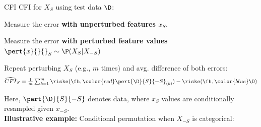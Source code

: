 \documentclass[10pt,compress,t,notes=noshow, xcolor=table]{beamer}
\begin{document}



\begin{framev}[align=top]{CFI  }
CFI for $X_S$ using test data $\D$:
\begin{itemizeM}
\item Measure the error {\color{blue}\textbf{with unperturbed features $x_S$}}.
\item Measure the error \textbf{\color{red}with perturbed feature values $\pert{x}{}{}_S \sim \P(X_S|X_{-S})$}
\item Repeat perturbing $X_S$ (e.g., $m$ times) and avg. difference of both errors:
$$\widehat{CFI}_S = \tfrac{1}{m} \textstyle\sum\nolimits_{k = 1}^{m} \riske (\fh, {\color{red}\pert{\D}{S}{-S}_{(k)}}) - \riske (\fh, {\color{blue}\D})$$
\end{itemizeM}
Here, $\pert{\D}{S}{-S}$ denotes data, where $x_S$ values are conditionally resampled given $x_{-S}$.\\
\spacer[0.25]
\textbf{Illustrative example:} Conditional permutation when $X_{-S}$ is categorical:
\spacer[0.5]
\begin{scriptsize}
\end{scriptsize}
\end{framev}
\end{document}

